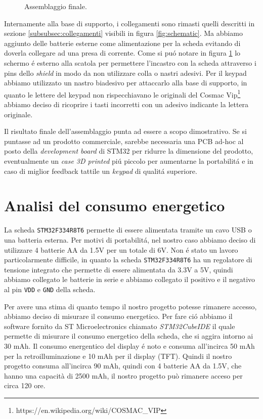 \documentclass[a4paper]{article}
\begin{document}
\begin{figure}[h!t]
\begin{center}
    \end{center}
    \caption{Assemblaggio finale.}
    \label{fig:assemblaggio}
\end{figure}

Internamente alla base di supporto, i collegamenti sono rimasti quelli descritti in sezione \ref{subsubsec:collegamenti} visibili in figura \ref{fig:schematic}. Ma abbiamo aggiunto delle batterie esterne come alimentazione per la scheda evitando di doverla collegare ad una presa di corrente. Come si pu\'o notare in figura \ref{fig:assemblaggio} lo schermo \'e esterno alla scatola per permettere l'incastro con la scheda attraverso i pins dello \textit{shield} in modo da non utilizzare colla o nastri adesivi. Per il keypad abbiamo utilizzato un nastro biadesivo per attaccarlo alla base di supporto, in quanto le lettere del keypad non rispecchiavano le originali del Cosmac Vip\footnote{https://en.wikipedia.org/wiki/COSMAC\_VIP} abbiamo deciso di ricoprire i tasti incorretti con un adesivo indicante la lettera originale.

Il risultato finale dell'assemblaggio punta ad essere a scopo dimostrativo. Se si puntasse ad un prodotto commerciale, sarebbe necessaria una PCB ad-hoc al posto della \textit{development board} di STM32 per ridurre la dimensione del prodotto, eventualmente un \textit{case 3D printed} pi\'u piccolo per aumentarne la portabilit\'a e in caso di miglior feedback tattile un \textit{keypad} di qualit\'a superiore.

\section{Analisi del consumo energetico}

La scheda \texttt{STM32F334R8T6} permette di essere alimentata tramite un cavo USB o una batteria esterna. Per motivi di portabilit\'a, nel nostro caso abbiamo deciso di utilizzare 4 batterie AA da 1.5V per un totale di 6V. Non \'e stato un lavoro particolarmente difficile, in quanto la scheda \texttt{STM32F334R8T6} ha un regolatore di tensione integrato che permette di essere alimentata da 3.3V a 5V, quindi abbiamo collegato le batterie in serie e abbiamo collegato il positivo e il negativo al pin \texttt{VDD} e \texttt{GND} della scheda.

Per avere una stima di quanto tempo il nostro progetto potesse rimanere accesso, abbiamo deciso di misurare il consumo energetico. Per fare ci\'o abbiamo il software fornito da ST Microelectronics chiamato \textit{STM32CubeIDE} il quale permette di misurare il consumo energetico della scheda, che si aggira intorno ai 30 mAh. Il consumo energentico del display \'e noto e consuma all'incirca 50 mAh per la retroilluminazione e 10 mAh per il display (TFT). Quindi il nostro progetto consuma all'incirca 90 mAh, quindi con 4 batterie AA da 1.5V, che hanno una capacità di 2500 mAh, il nostro progetto può rimanere acceso per circa 120 ore.
\end{document}
